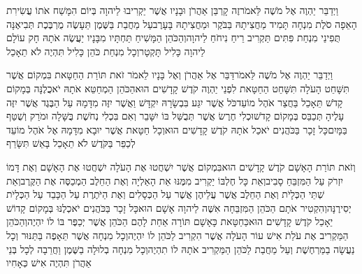\documentclass[../main/main.tex]{subfiles}
\begin{document}
\begin{multicols*}{\ncols}
וַיְדַבֵּר יַהְוֶה אֶל מֹשֶׁה לֵּאמֹר\PreVerseSpace{}זֶה קָרְבַּן אַהֲרֹן וּבָנָיו אֲשֶׁר יַקְרִיבוּ לַיהוָה בְּיוֹם הִמָּשַׁח אֹתוֹ עֲשִׂירִת הָאֵפָה סֹלֶת מִנְחָה תָּמִיד מַחֲצִיתָהּ בַּבֹּקֶר וּמַחֲצִיתָהּ בָּעָרֶב\PreVerseSpace{}עַל מַחֲבַת בַּשֶּׁמֶן תֵּעָשֶׂה מֻרְבֶּכֶת תְּבִיאֶנָּה תֻּפִינֵי מִנְחַת פִּתִּים תַּקְרִיב רֵיחַ נִיחֹחַ לַיהוָה\PreVerseSpace{}וְהַכֹּהֵן הַמָּשִׁיחַ תַּחְתָּיו מִבָּנָיו יַעֲשֶׂה אֹתָהּ חָק עוֹלָם לַיהוָה כָּלִיל תָּקְטָר\PreVerseSpace{}וְכָל מִנְחַת כֹּהֵן כָּלִיל תִּהְיֶה לֹא תֵאָכֵל\OpenSection{}\par
{}וַיְדַבֵּר יַהְוֶה אֶל מֹשֶׁה לֵּאמֹר\PreVerseSpace{}דַּבֵּר אֶל אַהֲרֹן וְאֶל בָּנָיו לֵאמֹר זֹאת תּוֹרַת הַחַטָּאת בִּמְקוֹם אֲשֶׁר תִּשָּׁחֵט הָעֹלָה תִּשָּׁחֵט הַחַטָּאת לִפְנֵי יַהְוֶה קֹדֶשׁ קָדָשִׁים הוּא\PreVerseSpace{}הַכֹּהֵן הַמְחַטֵּא אֹתָהּ יֹאכֲלֶנָּה בְּמָקוֹם קָדֹשׁ תֵּאָכֵל בַּחֲצַר אֹהֶל מוֹעֵד\PreVerseSpace{}כֹּל אֲשֶׁר יִגַּע בִּבְשָׂרָהּ יִקְדָּשׁ וַאֲשֶׁר יִזֶּה מִדָּמָהּ עַל הַבֶּגֶד אֲשֶׁר יִזֶּה עָלֶיהָ תְּכַבֵּס בְּמָקוֹם קָדֹשׁ\PreVerseSpace{}וּכְלִי חֶרֶשׂ אֲשֶׁר תְּבֻשַּׁל בּוֹ יִשָּׁבֵר וְאִם בִּכְלִי נְחֹשֶׁת בֻּשָּׁלָה וּמֹרַק וְשֻׁטַּף בַּמָּיִם\PreVerseSpace{}כָּל זָכָר בַּכֹּהֲנִים יֹאכַל אֹתָהּ קֹדֶשׁ קָדָשִׁים הוּא\PreVerseSpace{}וְכָל חַטָּאת אֲשֶׁר יוּבָא מִדָּמָהּ אֶל אֹהֶל מוֹעֵד לְכַפֵּר בַּקֹּדֶשׁ לֹא תֵאָכֵל בָּאֵשׁ תִּשָּׂרֵף\OpenSection{}\par
{}וְזֹאת תּוֹרַת הָאָשָׁם קֹדֶשׁ קָדָשִׁים הוּא\PreVerseSpace{}בִּמְקוֹם אֲשֶׁר יִשְׁחֲטוּ אֶת הָעֹלָה יִשְׁחֲטוּ אֶת הָאָשָׁם וְאֶת דָּמוֹ יִזְרֹק עַל הַמִּזְבֵּחַ סָבִיב\PreVerseSpace{}וְאֵת כָּל חֶלְבּוֹ יַקְרִיב מִמֶּנּוּ אֵת הָאַלְיָה וְאֶת הַחֵלֶב הַמְכַסֶּה אֶת הַקֶּרֶב\PreVerseSpace{}וְאֵת שְׁתֵּי הַכְּלָיֹת וְאֶת הַחֵלֶב אֲשֶׁר עֲלֵיהֶן אֲשֶׁר עַל הַכְּסָלִים וְאֶת הַיֹּתֶרֶת עַל הַכָּבֵד עַל הַכְּלָיֹת יְסִירֶנָּה\PreVerseSpace{}וְהִקְטִיר אֹתָם הַכֹּהֵן הַמִּזְבֵּחָה אִשֶּׁה לַיהוָה אָשָׁם הוּא\PreVerseSpace{}כָּל זָכָר בַּכֹּהֲנִים יֹאכְלֶנּוּ בְּמָקוֹם קָדוֹשׁ יֵאָכֵל קֹדֶשׁ קָדָשִׁים הוּא\PreVerseSpace{}כַּחַטָּאת כָּאָשָׁם תּוֹרָה אַחַת לָהֶם הַכֹּהֵן אֲשֶׁר יְכַפֶּר בּוֹ לוֹ יִהְיֶה\PreVerseSpace{}וְהַכֹּהֵן הַמַּקְרִיב אֶת עֹלַת אִישׁ עוֹר הָעֹלָה אֲשֶׁר הִקְרִיב לַכֹּהֵן לוֹ יִהְיֶה\PreVerseSpace{}וְכָל מִנְחָה אֲשֶׁר תֵּאָפֶה בַּתַּנּוּר וְכָל נַעֲשָׂה בַמַּרְחֶשֶׁת וְעַל מַחֲבַת לַכֹּהֵן הַמַּקְרִיב אֹתָהּ לוֹ תִהְיֶה\PreVerseSpace{}וְכָל מִנְחָה בְלוּלָה בַשֶּׁמֶן וַחֲרֵבָה לְכָל בְּנֵי אַהֲרֹן תִּהְיֶה אִישׁ כְּאָחִיו\OpenSection{}\par

\end{multicols*}
\end{document}
